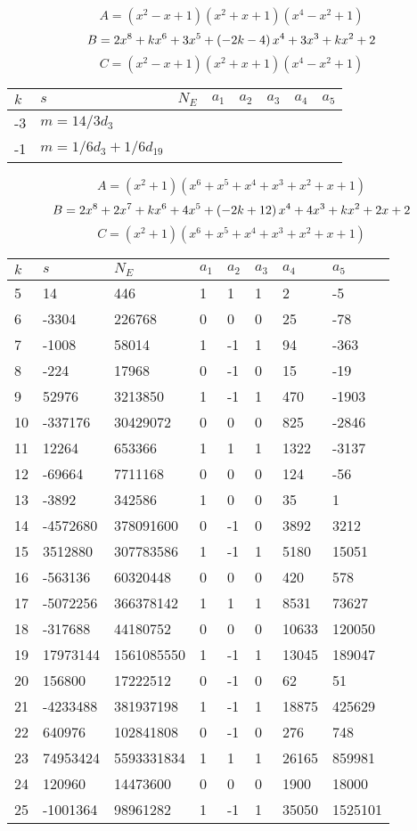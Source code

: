 \documentclass{amsart}
\begin{document}
$$A=(x^2
 - x
 + 1)(x^2
 + x
 + 1)(x^4
 - x^2
 + 1)$$
$$B=2\*x^8
 + k\*x^6
 + 3\*x^5
 + \left(-2\*k
 - 4\right) \*x^4
 + 3\*x^3
 + k\*x^2
 + 2$$
$$C=(x^2
 - x
 + 1)(x^2
 + x
 + 1)(x^4
 - x^2
 + 1)$$
\begin{longtable}{|l|l|l|lllll|}
\hline
$k$ & $s$ & $N_E$ & $a_1$ & $a_2$ & $a_3$ & $a_4$ & $a_5$\\
\hline
-3&$m=14/3d_{3}$&&\multicolumn{5}{c|}{}\\
-1&$m=1/6d_{3}+1/6d_{19}$&&\multicolumn{5}{c|}{}\\
\hline
\end{longtable}
$$A=(x^2
 + 1)(x^6
 + x^5
 + x^4
 + x^3
 + x^2
 + x
 + 1)$$
$$B=2\*x^8
 + 2\*x^7
 + k\*x^6
 + 4\*x^5
 + \left(-2\*k
 + 12\right) \*x^4
 + 4\*x^3
 + k\*x^2
 + 2\*x
 + 2$$
$$C=(x^2
 + 1)(x^6
 + x^5
 + x^4
 + x^3
 + x^2
 + x
 + 1)$$
\begin{longtable}{|l|l|l|lllll|}
\hline
$k$ & $s$ & $N_E$ & $a_1$ & $a_2$ & $a_3$ & $a_4$ & $a_5$\\
\hline
5&14&446&1&1&1&2&-5\\
6&-3304&226768&0&0&0&25&-78\\
7&-1008&58014&1&-1&1&94&-363\\
8&-224&17968&0&-1&0&15&-19\\
9&52976&3213850&1&-1&1&470&-1903\\
10&-337176&30429072&0&0&0&825&-2846\\
11&12264&653366&1&1&1&1322&-3137\\
12&-69664&7711168&0&0&0&124&-56\\
13&-3892&342586&1&0&0&35&1\\
14&-4572680&378091600&0&-1&0&3892&3212\\
15&3512880&307783586&1&-1&1&5180&15051\\
16&-563136&60320448&0&0&0&420&578\\
17&-5072256&366378142&1&1&1&8531&73627\\
18&-317688&44180752&0&0&0&10633&120050\\
19&17973144&1561085550&1&-1&1&13045&189047\\
20&156800&17222512&0&-1&0&62&51\\
21&-4233488&381937198&1&-1&1&18875&425629\\
22&640976&102841808&0&-1&0&276&748\\
23&74953424&5593331834&1&1&1&26165&859981\\
24&120960&14473600&0&0&0&1900&18000\\
25&-1001364&98961282&1&-1&1&35050&1525101\\

\end{longtable}
\end{document}
